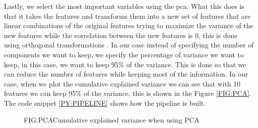 Lastly, we select the most important variables using the \ac{pca}. What this does is that it takes the features and transforms them into a new set of features that are linear combinations of the original features trying to maximize the variance of the new features while the correlation between the new features is 0, this is done using orthogonal transformations \cite{daffertshofer_pca_2004}. In our case instead of specifying the number of components we want to keep, we specify the percentage of variance we want to keep, in this case, we want to keep 95\% of the variance. This is done so that we can reduce the number of features while keeping most of the information. In our case, when we plot the cumulative explained variance we can see that with 10 features we can keep 95\% of the variance, this is shown in the Figure \ref{FIG:PCA}. The code snippet \ref{PY:PIPELINE} shows how the pipeline is built.

\begin{figure}[PCA]{FIG:PCA}{Cumulative explained variance when using PCA}
\end{figure}


